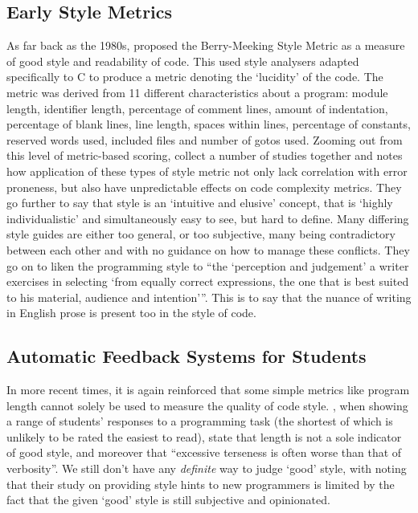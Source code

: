 \documentclass{article}
\begin{document}
    \subsection{Early Style Metrics}
        As far back as the 1980s, \cite{berryMeekingStyle} proposed the Berry-Meeking Style Metric as a measure of good style and readability of code. This used style analysers adapted specifically to C to produce a metric denoting the `lucidity' of the code. The metric was derived from 11 different characteristics about a program: module length, identifier length, percentage of comment lines, amount of indentation, percentage of blank lines, line length, spaces within lines, percentage of constants, reserved words used, included files and number of gotos used. Zooming out from this level of metric-based scoring, \cite{paradigmForStyleResearch} collect a number of studies together and notes how application of these types of style metric not only lack correlation with error proneness, but also have unpredictable effects on code complexity metrics. They go further to say that style is an `intuitive and elusive' concept, that is `highly individualistic' and simultaneously easy to see, but hard to define. Many differing style guides are either too general, or too subjective, many being contradictory between each other and with no guidance on how to manage these conflicts. They go on to liken the programming style to ``the `perception and judgement' a writer exercises in selecting `from equally correct expressions, the one that is best suited to his material, audience and intention'''. This is to say that the nuance of writing in English prose is present too in the style of code.

    \subsection{Automatic Feedback Systems for Students}
        In more recent times, it is again reinforced that some simple metrics like program length cannot solely be used to measure the quality of code style. \cite{autoStyleFeedbackAtScale}, when showing a range of students' responses to a programming task (the shortest of which is unlikely to be rated the easiest to read), state that length is not a sole indicator of good style, and moreover that ``excessive terseness is often worse than that of verbosity''. We still don't have any \emph{definite} way to judge `good' style, with \cite{scaleDrivenHints} noting that their study on providing style hints to new programmers is limited by the fact that the given `good' style is still subjective and opinionated.
\end{document}
